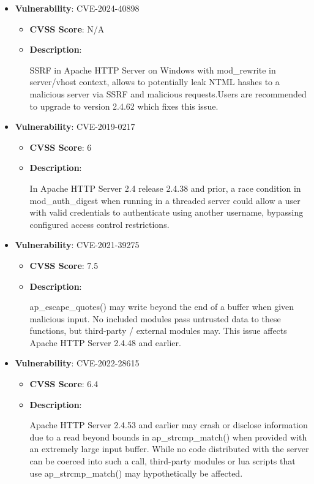\documentclass{article}
\begin{document}
\begin{itemize}
        \item \textbf{Vulnerability}: CVE-2024-40898
        \begin{itemize}
            \item \textbf{CVSS Score}:  N/A 
            \item \textbf{Description}:
            \parbox[t]{0.9\linewidth}{
                \ttfamily SSRF in Apache HTTP Server on Windows with mod\_rewrite in server/vhost context, allows to potentially leak NTML hashes to a malicious server via SSRF and malicious requests.Users are recommended to upgrade to version 2.4.62 which fixes this issue.
            }
        \end{itemize}
    
        \item \textbf{Vulnerability}: CVE-2019-0217
        \begin{itemize}
            \item \textbf{CVSS Score}:  6 
            \item \textbf{Description}:
            \parbox[t]{0.9\linewidth}{
                \ttfamily In Apache HTTP Server 2.4 release 2.4.38 and prior, a race condition in mod\_auth\_digest when running in a threaded server could allow a user with valid credentials to authenticate using another username, bypassing configured access control restrictions.
            }
        \end{itemize}
    
        \item \textbf{Vulnerability}: CVE-2021-39275
        \begin{itemize}
            \item \textbf{CVSS Score}:  7.5 
            \item \textbf{Description}:
            \parbox[t]{0.9\linewidth}{
                \ttfamily ap\_escape\_quotes() may write beyond the end of a buffer when given malicious input. No included modules pass untrusted data to these functions, but third-party / external modules may. This issue affects Apache HTTP Server 2.4.48 and earlier.
            }
        \end{itemize}
    
        \item \textbf{Vulnerability}: CVE-2022-28615
        \begin{itemize}
            \item \textbf{CVSS Score}:  6.4 
            \item \textbf{Description}:
            \parbox[t]{0.9\linewidth}{
                \ttfamily Apache HTTP Server 2.4.53 and earlier may crash or disclose information due to a read beyond bounds in ap\_strcmp\_match() when provided with an extremely large input buffer. While no code distributed with the server can be coerced into such a call, third-party modules or lua scripts that use ap\_strcmp\_match() may hypothetically be affected.
            }
        \end{itemize}
    

\end{itemize}
\end{document}
